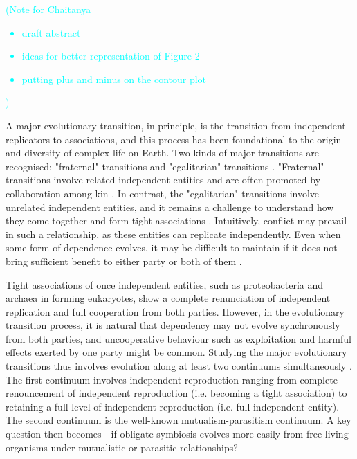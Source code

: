 \documentclass[11pt]{article}
\newcommand{\pn}[1]{\textcolor{cyan}{(#1)}}
\begin{document}

\pn{Note for Chaitanya
\begin{itemize}
	\item draft abstract
	\item ideas for better representation of Figure 2
	\item putting plus and minus on the contour plot
	\end{itemize}}

A major evolutionary transition, in principle, is the transition from independent replicators to associations, and this process has been foundational to the origin and diversity of complex life on Earth.
Two kinds of major transitions are recognised: "fraternal" transitions and "egalitarian" transitions \citep{queller:PTRSB:2000} . 
"Fraternal" transitions involve related independent entities and are often promoted by collaboration among kin \citep{nowak:Nature:2010}.
In contrast, the "egalitarian" transitions involve unrelated independent entities, and it remains a challenge to understand how they come together and form tight associations \citep{tarnita:JTB:2013}.
Intuitively, conflict may prevail in such a relationship, as these entities can replicate independently.
Even when some form of dependence evolves, it may be difficult to maintain if it does not bring sufficient benefit to either party or both of them \citep{athreya:AmNat:2025}.

Tight associations of once independent entities, such as proteobacteria and archaea in forming eukaryotes, show a complete renunciation of independent replication and full cooperation from both parties.
However, in the evolutionary transition process, it is natural that dependency may not evolve synchronously from both parties, and uncooperative behaviour such as exploitation and harmful effects exerted by one party might be common.
Studying the major evolutionary transitions thus involves evolution along at least two continuums simultaneously \citep{estrela:COM:2016} . 
The first continuum involves independent reproduction ranging from complete renouncement of independent reproduction (i.e. becoming a tight association) to retaining a full level of independent reproduction (i.e. full independent entity).
The second continuum is the well-known mutualism-parasitism continuum.
A key question then becomes - if obligate symbiosis evolves more easily from free-living organisms under mutualistic or parasitic relationships? 
\end{document}
